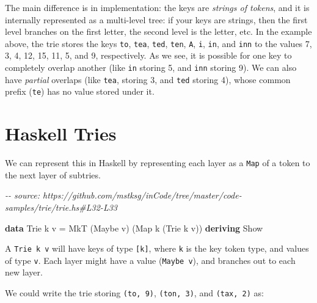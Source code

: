 \documentclass[]{article}
\newenvironment{Shaded}{}{}
\newcommand{\CommentTok}[1]{\textcolor[rgb]{0.38,0.63,0.69}{\textit{#1}}}
\newcommand{\DataTypeTok}[1]{\textcolor[rgb]{0.56,0.13,0.00}{#1}}
\newcommand{\KeywordTok}[1]{\textcolor[rgb]{0.00,0.44,0.13}{\textbf{#1}}}
\newcommand{\NormalTok}[1]{#1}
\newcommand{\OtherTok}[1]{\textcolor[rgb]{0.00,0.44,0.13}{#1}}
\begin{document}
The main difference is in implementation: the keys are \emph{strings of tokens},
and it is internally represented as a multi-level tree: if your keys are
strings, then the first level branches on the first letter, the second level is
the letter, etc. In the example above, the trie stores the keys \texttt{to},
\texttt{tea}, \texttt{ted}, \texttt{ten}, \texttt{A}, \texttt{i}, \texttt{in},
and \texttt{inn} to the values 7, 3, 4, 12, 15, 11, 5, and 9, respectively. As
we see, it is possible for one key to completely overlap another (like
\texttt{in} storing 5, and \texttt{inn} storing 9). We can also have
\emph{partial} overlaps (like \texttt{tea}, storing 3, and \texttt{ted} storing
4), whose common prefix (\texttt{te}) has no value stored under it.

\section{Haskell Tries}\label{haskell-tries}

We can represent this in Haskell by representing each layer as a \texttt{Map} of
a token to the next layer of subtries.

\begin{Shaded}
\begin{Highlighting}[]
\CommentTok{{-}{-} source: https://github.com/mstksg/inCode/tree/master/code{-}samples/trie/trie.hs\#L32{-}L33}

\KeywordTok{data} \DataTypeTok{Trie}\NormalTok{  k v   }\OtherTok{=} \DataTypeTok{MkT}\NormalTok{  (}\DataTypeTok{Maybe}\NormalTok{ v) (}\DataTypeTok{Map}\NormalTok{ k (}\DataTypeTok{Trie}\NormalTok{ k v))}
  \KeywordTok{deriving} \DataTypeTok{Show}
\end{Highlighting}
\end{Shaded}

A \texttt{Trie\ k\ v} will have keys of type \texttt{{[}k{]}}, where \texttt{k}
is the key token type, and values of type \texttt{v}. Each layer might have a
value (\texttt{Maybe\ v}), and branches out to each new layer.

We could write the trie storing \texttt{(to,\ 9)}, \texttt{(ton,\ 3)}, and
\texttt{(tax,\ 2)} as:
\end{document}

